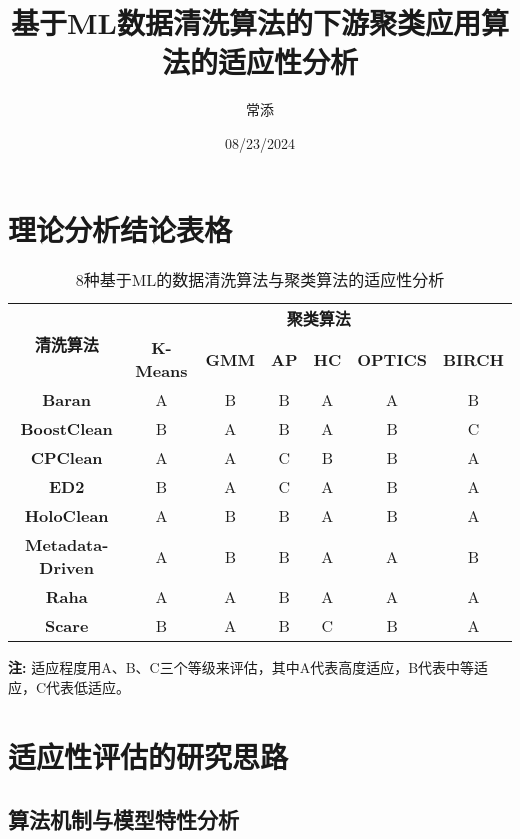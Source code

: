 \documentclass{ctexart} %
\begin{document}
\title{基于ML数据清洗算法的下游聚类应用算法的适应性分析}
\author{常添}
\date{08/23/2024}
\maketitle

\section{理论分析结论表格}

\begin{table}[h!]
\centering
\begin{tabular}{|c|c|c|c|c|c|c|}
\hline
\multirow{2}{*}{\textbf{清洗算法}} & \multicolumn{6}{c|}{\textbf{聚类算法}} \\ \cline{2-7}
 & \textbf{K-Means} & \textbf{GMM} & \textbf{AP} & \textbf{HC} & \textbf{OPTICS} & \textbf{BIRCH} \\ \hline
\textbf{Baran} & A & B & B & A & A & B \\ \hline
\textbf{BoostClean} & B & A & B & A & B & C \\ \hline
\textbf{CPClean} & A & A & C & B & B & A \\ \hline
\textbf{ED2} & B & A & C & A & B & A \\ \hline
\textbf{HoloClean} & A & B & B & A & B & A \\ \hline
\textbf{Metadata-Driven} & A & B & B & A & A & B \\ \hline
\textbf{Raha} & A & A & B & A & A & A \\ \hline
\textbf{Scare} & B & A & B & C & B & A \\ \hline
\end{tabular}
\caption{8种基于ML的数据清洗算法与聚类算法的适应性分析}
\label{table:ml_cleaning_clustering_adaptation}
\end{table}

\begin{flushleft}
\noindent \textbf{注:} 适应程度用A、B、C三个等级来评估，其中A代表高度适应，B代表中等适应，C代表低适应。
\end{flushleft}

\section{适应性评估的研究思路}
\subsection{算法机制与模型特性分析}
\end{document}
